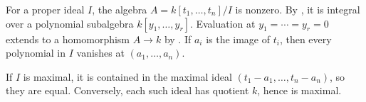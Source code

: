 For a proper ideal $I$, the algebra $A=k[t_1,\ldots,t_n]/I$ is nonzero. By , it is integral over a polynomial subalgebra $k[y_1,\ldots,y_r]$. Evaluation at $y_1=\cdots=y_r=0$ extends to a homomorphism $A\to k$ by . If $a_i$ is the image of $t_i$, then every polynomial in $I$ vanishes at $(a_1,\ldots,a_n)$.

If $I$ is maximal, it is contained in the maximal ideal $(t_1-a_1,\ldots,t_n-a_n)$, so they are equal. Conversely, each such ideal has quotient $k$, hence is maximal.
